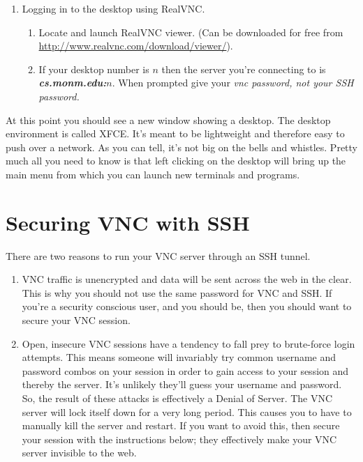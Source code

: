 \documentclass[10pt]{article}
\begin{document}
\begin{enumerate}
\item Logging in to the desktop using RealVNC.
\begin{enumerate}
\item Locate and launch RealVNC viewer. (Can be downloaded for free from \url{http://www.realvnc.com/download/viewer/}). 
\item If your desktop number is $n$ then the server you're connecting to is \textbf{\textit{cs.monm.edu:$n$}}. When prompted give your \textit{vnc password, not your SSH password.}
\end{enumerate}
\end{enumerate}
At this point you should see a new window showing a desktop.  The desktop environment is called XFCE. It's meant to be lightweight and therefore easy to push over a network.  As you can tell, it's not big on the bells and whistles.  Pretty much all you need to know is that left clicking on the desktop will bring up the main menu from which you can launch new terminals and programs.  

\newpage
\section{Securing VNC with SSH}

There are two reasons to run your VNC server through an SSH tunnel. 
\begin{enumerate}
\item VNC traffic is unencrypted and data will be sent across the web in the clear. This is why you should not use the same password for VNC and SSH. If you're a security conscious user, and you should be, then you should want to secure your VNC session.
\item Open, insecure VNC sessions have a tendency to fall prey to brute-force login attempts. This means someone will invariably try common username and password combos on your session in order to gain access to your session and thereby the server. It's unlikely they'll guess your username and password. So, the result of these attacks is effectively a Denial of Server. The VNC server will lock itself down for a very long period. This causes you to have to manually kill the server and restart.  If you want to avoid this, then secure your session with the instructions below; they effectively make your VNC server invisible to the web. 
\end{enumerate}
\end{document}
